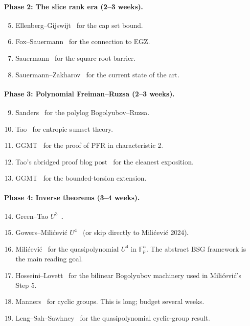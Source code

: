 \documentclass[11pt,a4paper]{article}
\theoremstyle{plain}
\theoremstyle{definition}
\theoremstyle{remark}
\newcommand{\F}{\mathbb{F}}
\begin{document}
\paragraph{Phase 2: The slice rank era (2--3 weeks).}
\begin{enumerate}[leftmargin=2em]
\setcounter{enumi}{4}
  \item Ellenberg--Gijswijt~\cite{ellenberggijswijt2017} for the cap set bound.
  \item Fox--Sauermann~\cite{foxsauermann2018} for the connection to EGZ.
  \item Sauermann~\cite{sauermann2021} for the square root barrier.
  \item Sauermann--Zakharov~\cite{sauermannzakharov2023} for the current state of the art.
\end{enumerate}

\paragraph{Phase 3: Polynomial Freiman--Ruzsa (2--3 weeks).}
\begin{enumerate}[leftmargin=2em]
\setcounter{enumi}{8}
  \item Sanders~\cite{sanders2012} for the polylog Bogolyubov--Ruzsa.
  \item Tao~\cite{tao2010} for entropic sumset theory.
  \item GGMT~\cite{ggmt2023} for the proof of PFR in characteristic 2.
  \item Tao's abridged proof blog post~\cite{tao2024abridged} for the cleanest exposition.
  \item GGMT~\cite{ggmt2024} for the bounded-torsion extension.
\end{enumerate}

\paragraph{Phase 4: Inverse theorems (3--4 weeks).}
\begin{enumerate}[leftmargin=2em]
\setcounter{enumi}{13}
  \item Green--Tao $U^3$~\cite{greentao2008}.
  \item Gowers--Mili\'cevi\'c $U^4$~\cite{gowersmilicevic2017} (or skip directly to Mili\'cevi\'c 2024).
  \item Mili\'cevi\'c~\cite{milicevic2024} for the quasipolynomial $U^4$ in $\F_p^n$. The abstract BSG framework is the main reading goal.
  \item Hosseini--Lovett~\cite{hosseinilovett2019} for the bilinear Bogolyubov machinery used in Mili\'cevi\'c's Step 5.
  \item Manners~\cite{manners2018} for cyclic groups. This is long; budget several weeks.
  \item Leng--Sah--Sawhney~\cite{lengsahsawhney2024} for the quasipolynomial cyclic-group result.
\end{enumerate}
\end{document}
